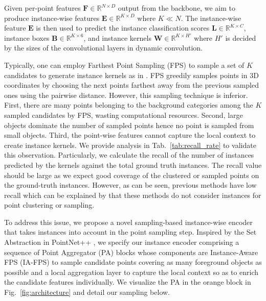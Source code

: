 \documentclass[10pt,twocolumn,letterpaper]{article}
\begin{document}
Given per-point features $\mathbf{F} \in \mathbb{R}^{N \times D}$ output from the backbone, 
we aim to produce instance-wise features $\mathbf{E} \in \mathbb{R}^{K \times D}$ where $K \ll N$. 
The instance-wise feature $\mathbf{E}$ is then used to predict the instance classification scores $\mathbf{L} \in \mathbb{R}^{K \times C}$, instance boxes $\mathbf{B} \in \mathbb{R}^{K \times 6}$, and instance kernels $\mathbf{W} \in \mathbb{R}^{K \times H'}$ where $H'$ is decided by the sizes of the convolutional layers in dynamic convolution. 

Typically, one can employ Farthest Point Sampling (FPS) \cite{eldar1997farthest} to sample a set of $K$ candidates to generate instance kernels as in \cite{He2022PointInst3DS3}. FPS greedily samples points in 3D coordinates by choosing the next points farthest away from the previous sampled ones using the pairwise distance.
However, this sampling technique is inferior.
First, there are many points belonging to the background categories among the $K$ sampled candidates by FPS, wasting computational resources. 
Second, large objects dominate the number of sampled points hence no point is sampled from small objects. Third, the point-wise features cannot capture the local context to create instance kernels. 
We provide analysis in Tab.~\ref{tab:recall_rate} to validate this observation.
Particularly, we calculate the recall of the number of instances predicted by the kernels against the total ground truth instances. 
The recall value should be large as we expect good coverage of the clustered or sampled points on the ground-truth instances. 
However, as can be seen, previous methods have low recall which can be explained by that these methods do not consider instances for point clustering or sampling. 

To address this issue, we propose a novel sampling-based instance-wise encoder that takes instances into account in the point sampling step. 
Inspired by the Set Abstraction in PointNet++ \cite{qi2018pointnet}, we specify our instance encoder comprising a sequence of Point Aggregator (PA) blocks whose components are Instance-Aware FPS (IA-FPS) to sample candidate points covering as many foreground objects as possible and a local aggregation layer to capture the local context so as to enrich the candidate features individually. We visualize the PA in the orange block in Fig.~\ref{fig:architecture} and detail our sampling below.

\end{document}
